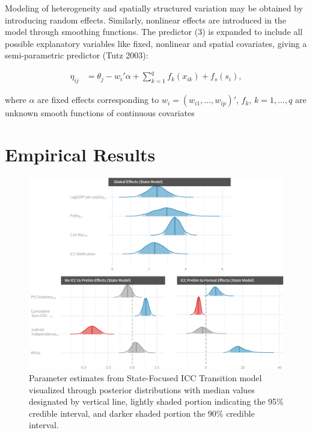 Modeling of heterogeneity and spatially structured variation may be obtained by introducing random effects. Similarly, nonlinear effects are introduced in the model through smoothing functions. The predictor (3) is expanded to include all possible explanatory variables like fixed, nonlinear and spatial covariates, giving a semi-parametric predictor (Tutz 2003): 

\begin{align*}
	\eta_{ij} &= \theta_{j} - w_{i}'\alpha + \sum_{k=1}^{q} f_{k}(x_{ik}) + f_{s}(s_{i}),
\end{align*}

where $\alpha$ are fixed effects corresponding to $w_{i} = (w_{i1},\ldots,w_{ip})'$, $f_{k}$, $k=1,\ldots,q$ are unknown smooth functions of continuous covariates



\section*{Empirical Results}

\begin{figure}
    \centering
    \includegraphics[width=1\textwidth]{stateCoefSumm.pdf}
    \caption{Parameter estimates from State-Focused ICC Transition model visualized through posterior distributions with median values designated by vertical line, lightly shaded portion indicating the 95\% credible interval, and darker shaded portion the 90\% credible interval.}
    \label{fig:stateModel}
\end{figure}

